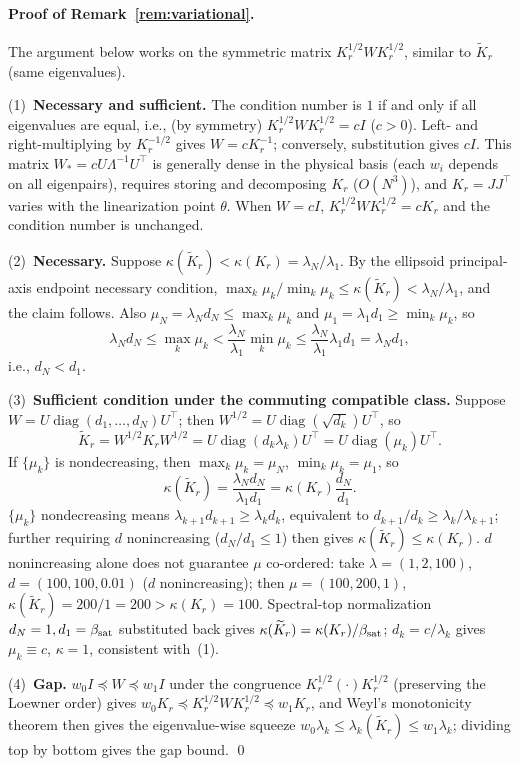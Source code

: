 \documentclass[11pt]{article}
\newcommand{\W}{W}
\DeclareMathOperator{\diag}{diag}
\numberwithin{equation}{section}
\begin{document}
\paragraph{Proof of Remark~\ref{rem:variational}.}
The argument below works on the symmetric matrix $K_r^{1/2}\W K_r^{1/2}$, similar to $\widetilde K_r$ (same eigenvalues).
\par\noindent(1)~\textbf{Necessary and sufficient.} The condition number is $1$ if and only if all eigenvalues are equal, i.e., (by symmetry) $K_r^{1/2}\W K_r^{1/2}=cI$ ($c>0$). Left- and right-multiplying by $K_r^{-1/2}$ gives $\W=cK_r^{-1}$; conversely, substitution gives $cI$. This matrix $\W_*=cU\Lambda^{-1}U^\top$ is generally dense in the physical basis (each $w_i$ depends on all eigenpairs), requires storing and decomposing $K_r$ ($O(N^3)$), and $K_r=JJ^\top$ varies with the linearization point $\theta$. When $\W=cI$, $K_r^{1/2}\W K_r^{1/2}=cK_r$ and the condition number is unchanged.
\par\noindent(2)~\textbf{Necessary.} Suppose $\kappa(\widetilde K_r)<\kappa(K_r)=\lambda_N/\lambda_1$. By the ellipsoid principal-axis endpoint necessary condition, $\max_k\mu_k/\min_k\mu_k\le\kappa(\widetilde K_r)<\lambda_N/\lambda_1$, and the claim follows. Also $\mu_N=\lambda_Nd_N\le\max_k\mu_k$ and $\mu_1=\lambda_1d_1\ge\min_k\mu_k$, so
\[
\lambda_Nd_N\le\max_k\mu_k<\frac{\lambda_N}{\lambda_1}\min_k\mu_k\le\frac{\lambda_N}{\lambda_1}\lambda_1d_1=\lambda_Nd_1,
\]
i.e., $d_N<d_1$.
\par\noindent(3)~\textbf{Sufficient condition under the commuting compatible class.} Suppose $\W=U\diag(d_1,\allowbreak \dots,\allowbreak d_N)U^\top$; then $\W^{1/2}=U\diag(\sqrt{d_k})U^\top$, so
\[
\widetilde K_r=\W^{1/2}K_r\W^{1/2}=U\diag(d_k\lambda_k)U^\top=U\diag(\mu_k)U^\top.
\]
If $\{\mu_k\}$ is nondecreasing, then $\max_k\mu_k=\mu_N$, $\min_k\mu_k=\mu_1$, so
\[
\kappa(\widetilde K_r)=\frac{\lambda_Nd_N}{\lambda_1d_1}=\kappa(K_r)\frac{d_N}{d_1}.
\]
$\{\mu_k\}$ nondecreasing means $\lambda_{k+1}d_{k+1}\ge\lambda_kd_k$, equivalent to $d_{k+1}/d_k\ge\lambda_k/\lambda_{k+1}$; further requiring $d$ nonincreasing ($d_N/d_1\le1$) then gives $\kappa(\widetilde K_r)\le\kappa(K_r)$. $d$ nonincreasing alone does not guarantee $\mu$ co-ordered: take $\lambda=(1,2,100)$, $d=(100,100,0.01)$ ($d$ nonincreasing); then $\mu=(100,200,1)$, $\kappa(\widetilde K_r)=200/1=200>\kappa(K_r)=100$. Spectral-top normalization $d_N=1,d_1=\beta_{\rm sat}$ substituted back gives $\kappa(\widetilde K_r)=\kappa(K_r)/\beta_{\rm sat}$; $d_k=c/\lambda_k$ gives $\mu_k\equiv c$, $\kappa=1$, consistent with~(1).
\par\noindent(4)~\textbf{Gap.} $w_0I\preceq\W\preceq w_1I$ under the congruence $K_r^{1/2}(\cdot)K_r^{1/2}$ (preserving the Loewner order) gives $w_0K_r\preceq K_r^{1/2}\W K_r^{1/2}\preceq w_1K_r$, and Weyl's monotonicity theorem then gives the eigenvalue-wise squeeze $w_0\lambda_k\le\lambda_k(\widetilde K_r)\le w_1\lambda_k$; dividing top by bottom gives the gap bound. \qed
\end{document}
